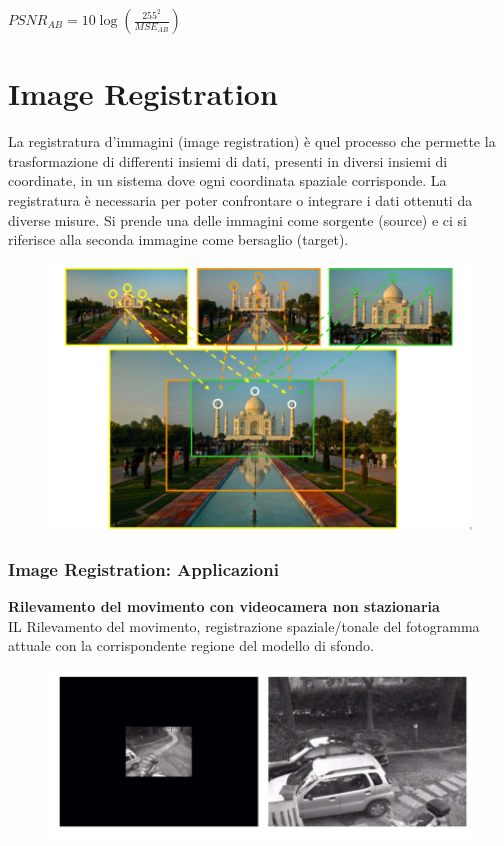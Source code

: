 \begin{center}
    $PSNR_{AB} = 10 \log(\frac{255^2}{MSE_{AB}})$
\end{center}

\section{Image Registration}
La registratura d'immagini (image registration) è quel processo che permette la trasformazione di differenti insiemi di dati, presenti in diversi insiemi di coordinate, in un sistema dove ogni coordinata
spaziale corrisponde. La registratura è necessaria per poter confrontare o integrare i dati ottenuti da diverse misure. Si prende una delle immagini come sorgente (source) e ci si
riferisce alla seconda immagine come bersaglio (target).

\begin{figure}[H]
    \centering
    \includegraphics[width=\linewidth, keepaspectratio]{capitoli/immagini/imgs/image-registration.png}
\end{figure}

\subsubsection{Image Registration: Applicazioni}
\textbf{Rilevamento del movimento con videocamera non stazionaria}
\\IL Rilevamento del movimento, registrazione spaziale/tonale del fotogramma attuale con la corrispondente regione del modello di
sfondo.

\begin{figure}[H]
    \centering
    \includegraphics[width=\linewidth, keepaspectratio]{capitoli/immagini/imgs/image-registration-applicazioni.png}
\end{figure}

